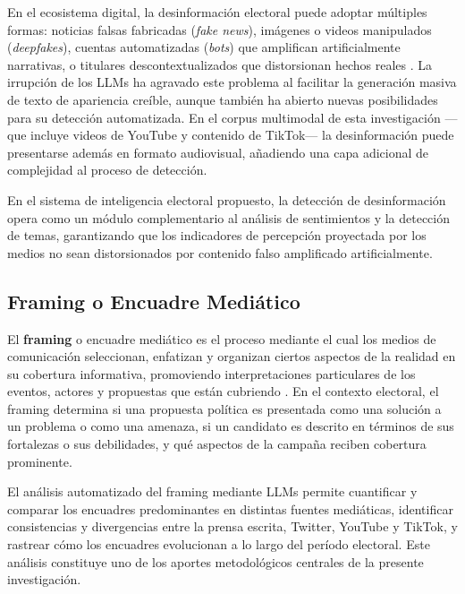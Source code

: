 En el ecosistema digital, la desinformación electoral puede adoptar múltiples formas: noticias falsas fabricadas (\textit{fake news}), imágenes o videos manipulados (\textit{deepfakes}), cuentas automatizadas (\textit{bots}) que amplifican artificialmente narrativas, o titulares descontextualizados que distorsionan hechos reales \parencite{pr_chen2024combating_misinformation}. La irrupción de los LLMs ha agravado este problema al facilitar la generación masiva de texto de apariencia creíble, aunque también ha abierto nuevas posibilidades para su detección automatizada. En el corpus multimodal de esta investigación —que incluye videos de YouTube y contenido de TikTok— la desinformación puede presentarse además en formato audiovisual, añadiendo una capa adicional de complejidad al proceso de detección.

En el sistema de inteligencia electoral propuesto, la detección de desinformación opera como un módulo complementario al análisis de sentimientos y la detección de temas, garantizando que los indicadores de percepción proyectada por los medios no sean distorsionados por contenido falso amplificado artificialmente.

\subsection{Framing o Encuadre Mediático}

El \textbf{framing} o encuadre mediático es el proceso mediante el cual los medios de comunicación seleccionan, enfatizan y organizan ciertos aspectos de la realidad en su cobertura informativa, promoviendo interpretaciones particulares de los eventos, actores y propuestas que están cubriendo \parencite{bk_entman1993framing}. En el contexto electoral, el framing determina si una propuesta política es presentada como una solución a un problema o como una amenaza, si un candidato es descrito en términos de sus fortalezas o sus debilidades, y qué aspectos de la campaña reciben cobertura prominente.

El análisis automatizado del framing mediante LLMs permite cuantificar y comparar los encuadres predominantes en distintas fuentes mediáticas, identificar consistencias y divergencias entre la prensa escrita, Twitter, YouTube y TikTok, y rastrear cómo los encuadres evolucionan a lo largo del período electoral. Este análisis constituye uno de los aportes metodológicos centrales de la presente investigación.

